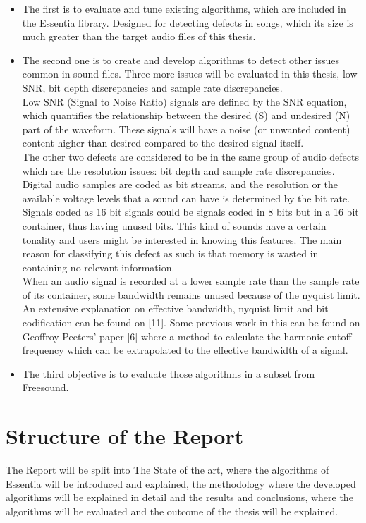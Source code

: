 \begin{itemize}
\item The first is to evaluate and tune existing algorithms, which are included in the Essentia library. 
Designed for detecting defects in songs, which its size is much greater than the target audio files of this thesis. 
\item The second one is to create and develop algorithms to detect other issues common in sound files. Three more issues will 
be evaluated in this thesis, low SNR, bit depth discrepancies and sample rate discrepancies. \\ Low SNR (Signal to Noise Ratio) 
signals are defined by the SNR equation, which quantifies the relationship between the desired (S) and undesired (N) part of the 
waveform. These signals will have a noise (or unwanted content) content higher than desired compared to the desired signal itself. 
\\ The other two defects are considered to be in the same group of audio defects which are the resolution issues: bit depth and 
sample rate discrepancies. \\ Digital audio samples are coded as bit streams, and the resolution or the available voltage levels 
that a sound can have is determined by the bit rate. Signals coded as 16 bit signals could be signals coded in 8 bits but in a 16 
bit container, thus having unused bits. This kind of sounds have a certain tonality and users might be interested in knowing this 
features. The main reason for classifying this defect as such is that memory is wasted in containing no relevant information.\\ 
When an audio signal is recorded at a lower sample rate than the sample rate of its container, some bandwidth remains unused 
because of the nyquist limit. An extensive explanation on effective bandwidth, nyquist limit and bit codification can be found 
on [11]. Some previous work in this can be found on Geoffroy Peeters’ paper [6] where a method to calculate the harmonic cutoff 
frequency which can be extrapolated to the effective bandwidth of a signal.
\item The third objective is to evaluate those algorithms in a subset from Freesound. 
\end{itemize}

\section{Structure of the Report}

The Report will be split into The State of the art, where the algorithms of Essentia will be introduced and explained, the methodology where the developed algorithms will be explained in detail and the results and conclusions, where the algorithms will be evaluated and the outcome of the thesis will be explained.

\newpage


